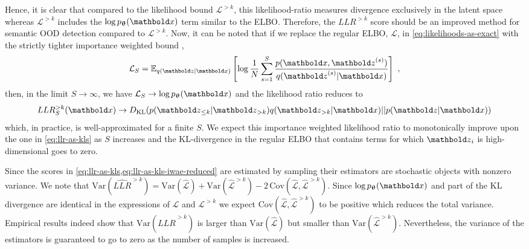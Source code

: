Hence, it is clear that compared to the likelihood bound $\mathcal{L}^{>k}$, this likelihood-ratio measures divergence exclusively in the latent space whereas $\mathcal{L}^{>k}$ includes the $\log p_\thetab(\xb)$ term similar to the ELBO.
Therefore, the $LLR^{>k}$ score should be an improved method for semantic OOD detection compared to $\mathcal{L}^{>k}$.
Now, it can be noted that if we replace the regular ELBO, $\mathcal{L}$, in \eqref{eq:likelihoods-as-exact} with the strictly tighter importance weighted bound \cite{burda_importance_2016},
\begin{equation}
    \mathcal{L}_{S} = \mathbb{E}_{q(\zb|\xb)}\left[ \log \frac{1}{N} \sum_{s=1}^{S} \frac{p(\xb, \zb^{(s)})}{q(\zb^{(s)}|\xb)} \right] \ , \label{eq:iw-bound}
\end{equation}
then, in the limit $S\rightarrow\infty$, we have $\mathcal{L}_{S} \rightarrow \log p_\thetab(\xb)$ and the likelihood ratio reduces to
\begin{equation}
    LLR^{>k}_{S}(\xb) \rightarrow D_{\mathrm{KL}}( p(\zb_{\leq k}|\zb_{>k}) q(\zb_{>k}|\xb) || p(\zb|\xb))
\end{equation}\label{eq:llr-as-kls-iwae-reduced}
which, in practice, is well-approximated for a finite $S$. We expect this importance weighted likelihood ratio to monotonically improve upon the one in \cref{eq:llr-as-kls} as $S$ increases and the KL-divergence in the regular ELBO that contains terms for which $\zb_i$ is high-dimensional goes to zero.


Since the scores in \cref{eq:llr-as-kls,eq:llr-as-kls-iwae-reduced} are estimated by sampling their estimators are stochastic objects with nonzero variance.
We note that $\text{Var}(\widehat{LLR}^{>k}) = \text{Var}(\hat{\mathcal{L}}) + \text{Var}(\hat{\mathcal{L}}^{>k}) - 2\, \text{Cov}(\hat{\mathcal{L}}, \hat{\mathcal{L}}^{>k})$.
Since $\log p_\thetab(\xb)$ and part of the KL divergence are identical in the expressions of $\mathcal{L}$ and $\mathcal{L}^{>k}$ we expect $\text{Cov}(\hat{\mathcal{L}}, \hat{\mathcal{L}}^{>k})$ to be positive which reduces the total variance. 
Empirical results indeed show that $\text{Var}(\widehat{LLR}^{>k})$ is larger than $\text{Var}(\hat{\mathcal{L}})$ but smaller than $\text{Var}(\hat{\mathcal{L}}^{>k})$.
Nevertheless, the variance of the estimators is guaranteed to go to zero as the number of samples is increased.

